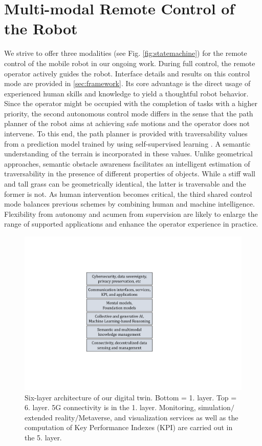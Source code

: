 \documentclass[letterpaper, 10 pt, conference]{ieeeconf}  %
\begin{document}
\section{Multi-modal Remote Control of the Robot}
We strive to offer three modalities (see Fig. \ref{fig:statemachine}) for the remote control of the mobile robot in our ongoing work. During  full control, the remote operator actively guides the robot. Interface details and  results on this control mode are provided in  \cref{sec:framework}. Its core advantage is the direct usage of experienced human skills and knowledge to yield a thoughtful robot behavior. Since the operator might be occupied with the completion of  tasks with a higher priority, the second autonomous control mode differs  in the sense that the path planner of the robot aims at achieving safe motions and the operator does not intervene. To this end, the path planner is provided with traversability values from a prediction model trained by using self-supervised learning \cite{wayfaster}. A semantic understanding of the terrain  is incorporated in these values. Unlike geometrical approaches, semantic obstacle awareness facilitates an intelligent estimation of traversability in the presence of  different properties of objects. While a stiff wall and tall grass can be geometrically identical, the latter is traversable and the former is not. As human intervention becomes critical, the third shared control mode balances previous schemes by combining human and machine intelligence. Flexibility from autonomy and acumen from supervision are likely to enlarge the range of supported applications and enhance the operator experience in practice.




\begin{figure}[t]
	\vspace{0.2cm}
	\centerline{\includegraphics[height=0.7\columnwidth]{images/DT.pdf}}
	\caption{Six-layer architecture of our digital twin. Bottom = 1. layer. Top = 6. layer. 5G connectivity is in the 1. layer. Monitoring, simulation$\slash$extended reality$\slash$Metaverse, and visualization services as well as the computation of Key Performance Indexes (KPI) are carried out in the 5. layer. }
	\label{fig:DT}
\end{figure}
\end{document}
